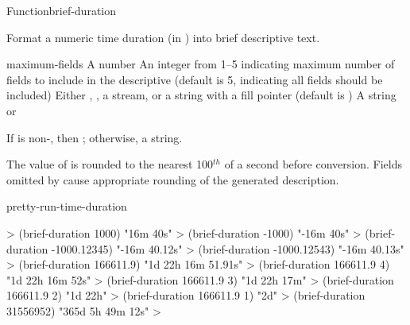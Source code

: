 \documentclass[10pt,twoside,english,pdftex]{article}
\begin{document}
\begin{functiondoc}{Function}{brief-duration}{%
      
    \returns{} }
% 

\fnsyntax

\fnpurpose Format a numeric time duration (in ) into
brief descriptive text.

\fnpackage {}

\fnmodule {}

\fnargs
\begin{args}{maximum-fields}
\arg[seconds] A number
 An integer from 1--5 indicating maximum number of fields 
to include in the descriptive  (default is 5, indicating all 
fields should be included)
\arg[destination] Either \nil, , a stream, or a string with a fill 
pointer (default is \nil)
\arg[result] A string or \nil{}
\end{args}

\fnreturns If  is non-\nil, then \nil; otherwise, a string.

\fndescription The value of  is rounded to the nearest
100$^{th}$ of a second before conversion.  Fields omitted by
 cause appropriate rounding of the generated
description.

\begin{alsos}{pretty-run-time-duration}
\end{alsos}

\fnexamples
%
\W\supp
\begin{example}
  > (brief-duration 1000)
  "16m 40s"
  > (brief-duration -1000)
  "-16m 40s"
  > (brief-duration -1000.12345)
  "-16m 40.12s"
  > (brief-duration -1000.12543)
  "-16m 40.13s"\goodpagebreak
  > (brief-duration 166611.9)
  "1d 22h 16m 51.91s"
  > (brief-duration 166611.9 4)
  "1d 22h 16m 52s"
  > (brief-duration 166611.9 3)
  "1d 22h 17m"
  > (brief-duration 166611.9 2)
  "1d 22h"
  > (brief-duration 166611.9 1)
  "2d"
  > (brief-duration 31556952)
  "365d 5h 49m 12s"
  >
\end{example}

\end{functiondoc}

\end{document}
